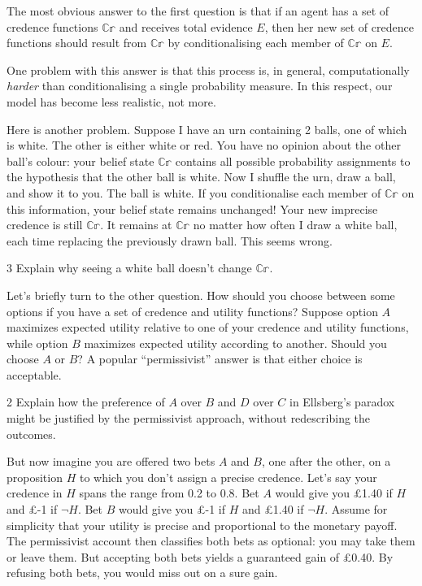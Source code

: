 The most obvious answer to the first question is that if an agent has a set of
credence functions $\mathbb{C\!r}$ and receives total evidence $E$, then her new
set of credence functions should result from $\mathbb{C\!r}$ by conditionalising
each member of $\mathbb{C\!r}$ on $E$.

One problem with this answer is that this process is, in general,
computationally \emph{harder} than conditionalising a single probability
measure. In this respect, our model has become less realistic, not more.

Here is another problem. Suppose I have an urn containing 2 balls, one of which
is white. The other is either white or red. You have no opinion about the
other ball's colour: your belief state $\mathbb{C\!r}$ contains all possible
probability assignments to the hypothesis that the other ball is white. Now I
shuffle the urn, draw a ball, and show it to you. The ball is white. If you
conditionalise each member of $\mathbb{C\!r}$ on this information, your belief
state remains unchanged! Your new imprecise credence is still $\mathbb{C\!r}$. It
remains at $\mathbb{C\!r}$ no matter how often I draw a white ball, each time
replacing the previously drawn ball. This seems wrong.

\begin{exercise}{3}
  Explain why seeing a white ball doesn't change $\mathbb{C\!r}$.
\end{exercise}

Let's briefly turn to the other question. How should you choose between some
options if you have a set of credence and utility functions? Suppose option $A$
maximizes expected utility relative to one of your credence and utility
functions, while option $B$ maximizes expected utility according to another.
Should you choose $A$ or $B$? A popular ``permissivist'' answer is that either
choice is acceptable.

\begin{exercise}{2}
  Explain how the preference of $A$ over $B$ and $D$ over $C$ in Ellsberg's
  paradox might be justified by the permissivist approach, without redescribing
  the outcomes.
\end{exercise}

But now imagine you are offered two bets $A$ and $B$, one after the other, on a
proposition $H$ to which you don't assign a precise credence. Let's say your
credence in $H$ spans the range from 0.2 to 0.8. Bet $A$ would give you
£1.40 if $H$ and £-1 if $\neg H$. Bet $B$ would give you £-1 if $H$ and £1.40 if
$\neg H$. Assume for simplicity that your utility is precise and proportional to
the monetary payoff. The permissivist account then classifies both bets as
optional: you may take them or leave them. But accepting both bets yields a
guaranteed gain of £0.40. By refusing both bets, you would miss out on a sure
gain.


